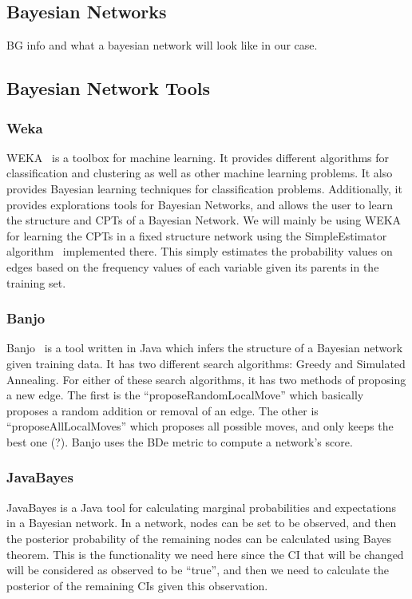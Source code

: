 \documentclass{article}
\begin{document}
\subsection{Bayesian Networks}

BG info and what a bayesian network will look like in our case.

\subsection{Bayesian Network Tools}

\subsubsection{Weka}

WEKA~\cite{hall2009weka} is a toolbox for machine learning. It provides different algorithms for classification and clustering as well as other machine
learning problems. It also provides Bayesian learning techniques for classification problems. Additionally, it provides explorations tools for Bayesian
Networks, and allows the user to learn the structure and CPTs of a Bayesian Network. We will mainly be using WEKA for learning the CPTs in a fixed
structure network using the SimpleEstimator algorithm~\cite{witten2005data} implemented there. This simply estimates the probability values on edges based on
the frequency values of each variable given its parents in the training set.

\subsubsection{Banjo}
Banjo~\cite{banjotool} is a tool written in Java which infers the structure of a Bayesian network given training data. It has two different search algorithms:
Greedy and Simulated Annealing. For either of these search algorithms, it has two methods of proposing a new edge. The first is the ``proposeRandomLocalMove''
which basically proposes a random addition or removal of an edge. The other is ``proposeAllLocalMoves'' which proposes all possible moves, and only keeps the
best one (?). Banjo uses the BDe metric to compute a network's score.

\subsubsection{JavaBayes}

JavaBayes is a Java tool for calculating marginal probabilities and expectations in a Bayesian network. In a network, nodes can be set to be observed, and then
the posterior probability of the remaining nodes can be calculated using Bayes theorem. This is the functionality we need here since the CI that will be
changed will be considered as observed to be ``true'', and then we need to calculate the posterior of the remaining CIs given this observation.
\end{document}
